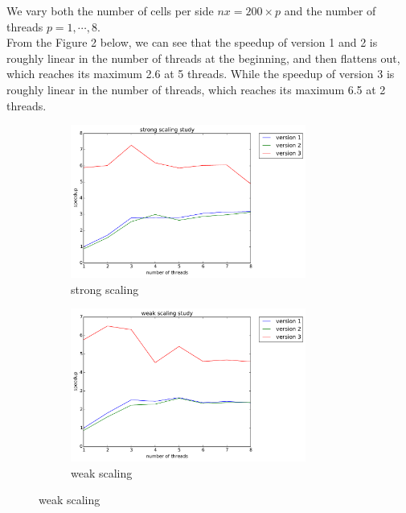 \documentclass[12pt]{article}
\numberwithin{equation}{section}
\begin{document}
We vary both the number of cells per side $nx = 200 \times p$ and the number of threads $p = 1, \cdots, 8$.
\\
From the Figure 2 below, we can see that the speedup of version 1 and 2 is roughly linear in the number of threads at the beginning, and then flattens out, which reaches its maximum 2.6 at 5 threads. While the speedup of version 3 is roughly linear in the number of threads, which reaches its maximum 6.5 at 2 threads.












\begin{figure}[!ht]
   \begin{subfigure}
      \centering
        \begin{center}
      \includegraphics[width=0.85\textwidth] {timing_strong}
        \end{center}
      \label{aload0}
      \caption{strong scaling}
  \end{subfigure}
  \begin{subfigure}
      \centering
        \begin{center}
      \includegraphics[width=0.85\textwidth] {timing_weak}
        \end{center}
      \label{aload1}
      \caption{weak scaling}
  \end{subfigure}

\end{figure}
\end{document}
